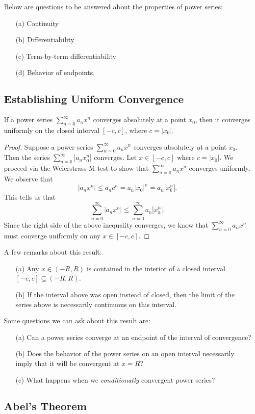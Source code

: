Below are questions to be answered about the properties of power series:
\begin{enumerate}
    \item[(a)] Continuity
    \item[(b)] Differentiability
    \item[(c)] Term-by-term differentiability
    \item[(d)] Behavior of endpoints.
\end{enumerate}
\subsection{Establishing Uniform Convergence}

\begin{tcolorbox}
\begin{thm}
    If a power series \( \sum_{ n= 0 }^{  \infty   } a_n x^n \) converges absolutely at a point \( x_0  \), then it converges uniformly on the closed interval \( [-c , c ] \), where \( c  = | x_0  |  \).
\end{thm}
\end{tcolorbox}

\begin{proof}
    Suppose a power series \( \sum_{ n=0  }^{  \infty   } a_n x^n  \) converges absolutely at a point \( x_0  \). Then the series \(  \sum_{ n=0  }^{  \infty  } | a_n x_0^n |  \) converges. Let \( x \in [-c , c ] \) where \( c = | x_0  |  \). We proceed via the Weierstrass M-test to show that \( \sum_{ n=0  }^{ \infty  } a_n x^n  \) converges uniformly. We observe that 
    \[  | a_n x^n  |  \leq a_n c^n = a_n | x_0  |^n = a_n | x_0^n | .  \]
    This tells us that 
    \[  \sum_{ n=0 }^{  \infty   } | a_n x^n | \leq \sum_{ n=0  }^{ \infty  } a_n | x_0^n  |.   \]
    Since the right side of the above inequality converges, we know that \( \sum_{ n=0  }^{ \infty  } a_n x^n  \) must converge uniformly on any \( x \in [-c ,c ]  \).
\end{proof}
A few remarks about this result:
\begin{enumerate}
    \item[(a)] Any \( x \in (-R, R ) \) is contained in the interior of a closed interval \( [-c , c ]  \subseteq (-R ,R )\).
    \item[(b)] If the interval above was open instead of closed, then the limit of the series above is necessarily continuous on this interval. 
\end{enumerate}

Some questions we can ask about this result are:
\begin{enumerate}
    \item[(a)] Can a power series converge at an endpoint of the interval of convergence? 
    \item[(b)] Does the behavior of the power series on an open interval necessarily imply that it will be convergent at \( x = R  \)? 
    \item[(c)] What happens when we \textit{conditionally} convergent power series?
\end{enumerate}

\subsection{Abel's Theorem}




